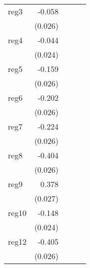 {\begin{longtable}{l*{4}{D{.}{.}{-1}}}
\addlinespace
reg3        &      -0.058\sym{*}  &                     &                     &                     \\
            &     (0.026)         &                     &                     &                     \\
\addlinespace
reg4        &      -0.044         &                     &                     &                     \\
            &     (0.024)         &                     &                     &                     \\
\addlinespace
reg5        &      -0.159\sym{***}&                     &                     &                     \\
            &     (0.026)         &                     &                     &                     \\
\addlinespace
reg6        &      -0.202\sym{***}&                     &                     &                     \\
            &     (0.026)         &                     &                     &                     \\
\addlinespace
reg7        &      -0.224\sym{***}&                     &                     &                     \\
            &     (0.026)         &                     &                     &                     \\
\addlinespace
reg8        &      -0.404\sym{***}&                     &                     &                     \\
            &     (0.026)         &                     &                     &                     \\
\addlinespace
reg9        &       0.378\sym{***}&                     &                     &                     \\
            &     (0.027)         &                     &                     &                     \\
\addlinespace
reg10       &      -0.148\sym{***}&                     &                     &                     \\
            &     (0.024)         &                     &                     &                     \\
\addlinespace
reg12       &      -0.405\sym{***}&                     &                     &                     \\
            &     (0.026)         &                     &                     &                     \\

\end{longtable}}

